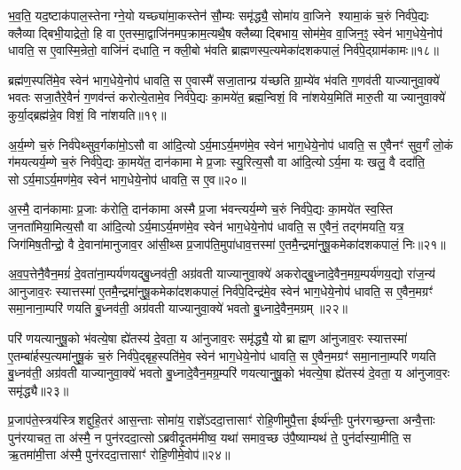 भ॒व॒ति॒ यद॒ष्टाक॑पाल॒स्तेनाग्ने॒यो यच्छ्या॑मा॒कस्तेन॑ सौ॒म्यः समृ॑द्ध्यै॒ सोमा॑य वा॒जिने श्यामा॒कं च॒रुं निर्व॑पे॒द्यः क्लैव्याद्बिभी॒याद्रेतो॒ हि वा ए॒तस्मा॒द्वाजि॑नमप॒क्राम॒त्यथै॒ष क्लैब्याद्बिभाय॒ सोम॑मे॒व वा॒जिन॒ꣵ॒ स्वेन॑ भाग॒धेये॒नोप॑ धावति॒ स ए॒वास्मि॒न्रेतो॒ वाजि॑नं दधाति॒ न क्ली॒बो भ॑वति ब्राह्मणस्प॒त्यमेका॑दशकपालं॒ निर्व॑पे॒द्ग्राम॑कामः॥१८॥

ब्रह्म॑ण॒स्पति॑मे॒व स्वेन॑ भाग॒धेये॒नोप॑ धावति॒ स ए॒वास्मै॑ सजा॒तान्प्र य॑च्छति ग्रा॒म्ये॑व भ॑वति ग॒णव॑ती याज्यानुवा॒क्ये॑ भवतः सजा॒तैरे॒वैनं॑ ग॒णव॑न्तं करोत्ये॒तामे॒व निर्व॑पे॒द्यः का॒मये॑त॒ ब्रह्म॒न्विशं॒ वि ना॑शयेय॒मिति॑ मारु॒ती याज्यानुवा॒क्ये॑ कुर्या॒द्ब्रह्म॑न्ने॒व विशं॒ वि ना॑शयति॥१९॥

{\anuvakamend[{तेजः॑ स॒मीची ब्रह्मवर्च॒स्ये॑व ग्राम॑काम॒स्त्रिच॑त्वारिशच्च॥३॥}]}

अ॒र्य॒म्णे च॒रुं निर्व॑पेथ्सुव॒र्गका॑मो॒ऽसौ वा आ॑दि॒त्योऽर्य॒माऽर्य॒मण॑मे॒व स्वेन॑ भाग॒धेये॒नोप॑ धावति॒ स ए॒वैनꣳ॑ सुव॒र्गं लो॒कं ग॑मयत्यर्य॒म्णे च॒रुं निर्व॑पे॒द्यः का॒मये॑त॒ दान॑कामा मे प्र॒जाः स्यु॒रित्य॒सौ वा आ॑दि॒त्योऽर्य॒मा यः खलु॒ वै ददा॑ति॒ सोऽर्य॒माऽर्य॒मण॑मे॒व स्वेन॑ भाग॒धेये॒नोप॑ धावति॒ स ए॒व॥२०॥

अ॒स्मै॒ दान॑कामाः प्र॒जाः क॑रोति॒ दान॑कामा अस्मै प्र॒जा भ॑वन्त्यर्य॒म्णे च॒रुं निर्व॑पे॒द्यः का॒मये॑त स्व॒स्ति ज॒नता॑मिया॒मित्य॒सौ वा आ॑दि॒त्योऽर्य॒माऽर्य॒मण॑मे॒व स्वेन॑ भाग॒धेये॒नोप॑ धावति॒ स ए॒वैनं॒ तद्ग॑मयति॒ यत्र॒ जिग॑मिष॒तीन्द्रो॒ वै दे॒वाना॑मानुजाव॒र आ॑सी॒थ्स प्र॒जाप॑ति॒मुपा॑धाव॒त्तस्मा॑ ए॒तमै॒न्द्रमा॑नुषू॒कमेका॑दशकपालं॒ निः॥२१॥

अ॒व॒प॒त्तेनै॒वैन॒मग्रं॑ दे॒वता॑ना॒म्पर्य॑णयद्बु॒ध्नव॑ती॒ अग्र॑वती याज्यानुवा॒क्ये॑ अकरोद्बु॒ध्नादे॒वैन॒मग्र॒म्पर्य॑णय॒द्यो रा॑ज॒न्य॑ आनुजाव॒रः स्यात्तस्मा॑ ए॒तमै॒न्द्रमा॑नुषू॒कमेका॑दशकपालं॒ निर्व॑पे॒दिन्द्र॑मे॒व स्वेन॑ भाग॒धेये॒नोप॑ धावति॒ स ए॒वैन॒मग्रꣳ॑ समा॒नाना॒म्परि॑ णयति बु॒ध्नव॑ती॒ अग्र॑वती याज्यानुवा॒क्ये॑ भवतो बु॒ध्नादे॒वैन॒मग्रम्॥२२॥

परि॑ णयत्यानुषू॒को भ॑वत्ये॒षा ह्ये॑तस्य॑ दे॒वता॒ य आ॑नुजाव॒रः समृ॑द्ध्यै॒ यो ब्राह्म॒ण आ॑नुजाव॒रः स्यात्तस्मा॑ ए॒तम्बा॑र्\mbox{}हस्प॒त्यमा॑नुषू॒कं च॒रुं निर्व॑पे॒द्बृह॒स्पति॑मे॒व स्वेन॑ भाग॒धेये॒नोप॑ धावति॒ स ए॒वैन॒मग्रꣳ॑ समा॒नाना॒म्परि॑ णयति बु॒ध्नव॑ती॒ अग्र॑वती याज्यानुवा॒क्ये॑ भवतो बु॒ध्नादे॒वैन॒मग्र॒म्परि॑ णयत्यानुषू॒को भ॑वत्ये॒षा ह्ये॑तस्य॑ दे॒वता॒ य आ॑नुजाव॒रः समृ॑द्ध्यै॥२३॥

{\anuvakamend[{ए॒व निरग्र॑मे॒तस्य॑ च॒त्वारि॑ च॥४॥}]}

प्र॒जाप॑ते॒स्त्रय॑स्त्रिशद्दुहि॒तर॑ आस॒न्ताः सोमा॑य॒ राज्ञे॑ऽददा॒त्तासाꣳ॑ रोहि॒णीमुपै॒त्ता ईर्ष्य॑न्तीः॒ पुन॑रगच्छ॒न्ता अन्वै॒त्ताः पुन॑रयाचत॒ ता अ॑स्मै॒ न पुन॑रददा॒त्सोऽब्रवीदृ॒तम॑मीष्व॒ यथा॑ समाव॒च्छ उ॑पै॒ष्याम्यथ॑ ते॒ पुन॑र्दास्या॒मीति॒ स ऋ॒तमा॑मी॒त्ता अ॑स्मै॒ पुन॑रददा॒त्तासाꣳ॑ रोहि॒णीमे॒वोप॑॥२४॥

